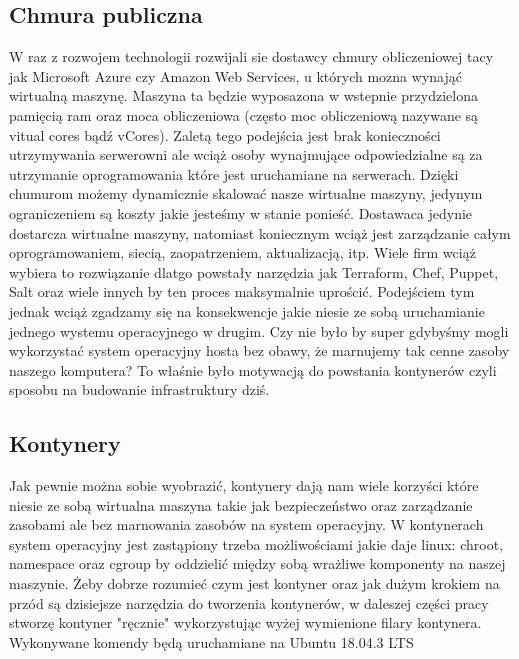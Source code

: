 \subsection{Chmura publiczna}
W raz z rozwojem technologii rozwijali sie dostawcy chmury obliczeniowej tacy jak Microsoft Azure czy Amazon Web Services, u których mozna wynająć wirtualną maszynę. Maszyna ta będzie wyposazona w wstepnie przydzielona pamięcią ram oraz moca obliczeniowa (często moc obliczeniową nazywane są vitual cores bądź vCores). 
Zaletą tego podejścia jest brak konieczności utrzymywania serwerowni ale wciąż osoby wynajmujące odpowiedzialne są za utrzymanie oprogramowania które jest uruchamiane na serwerach. 
Dzięki chumurom możemy dynamicznie skalować nasze wirtualne maszyny, jedynym ograniczeniem są koszty jakie jesteśmy w stanie ponieść. Dostawaca jedynie dostarcza wirtualne maszyny, natomiast koniecznym wciąż jest zarządzanie całym oprogramowaniem, siecią, zaopatrzeniem, aktualizacją, itp. Wiele firm wciąż wybiera to rozwiązanie dlatgo powstały narzędzia jak Terraform, Chef, Puppet, Salt oraz wiele innych by ten proces maksymalnie uprościć. 
Podejściem tym jednak wciąż zgadzamy się na konsekwencje jakie niesie ze sobą uruchamianie jednego wystemu operacyjnego w drugim. Czy nie było by super gdybyśmy mogli wykorzystać system operacyjny hosta bez obawy, że marnujemy tak cenne zasoby naszego komputera? To właśnie było motywacją do powstania kontynerów czyli sposobu na budowanie infrastruktury dziś. 
\subsection{Kontynery}
Jak pewnie można sobie wyobrazić, kontynery dają nam wiele korzyści które niesie ze sobą wirtualna maszyna takie jak bezpieczeństwo oraz zarządzanie zasobami ale bez marnowania zasobów na system operacyjny. W kontynerach system operacyjny jest zastąpiony trzeba możliwościami jakie daje linux: chroot, namespace oraz cgroup by oddzielić między sobą wrażliwe komponenty na naszej maszynie.
Żeby dobrze rozumieć czym jest kontyner oraz jak dużym krokiem na przód są dzisiejsze narzędzia do tworzenia kontynerów, w daleszej części pracy stworzę kontyner "ręcznie" wykorzystując wyżej wymienione filary kontynera. Wykonywane komendy będą uruchamiane na Ubuntu 18.04.3 LTS

